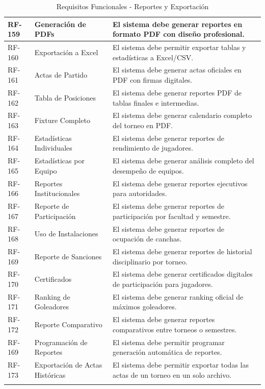 \documentclass[12pt,a4paper]{article}
\begin{document}
\begin{longtable}{|>{\centering\arraybackslash}p{1.5cm}|>{\raggedright\arraybackslash}p{3.2cm}|>{\raggedright\arraybackslash}p{9cm}|}
RF-159 & Generación de PDFs & El sistema debe generar reportes en formato PDF con diseño profesional. \\
\hline
\rowcolor{rowgray}
RF-160 & Exportación a Excel & El sistema debe permitir exportar tablas y estadísticas a Excel/CSV. \\
\hline
RF-161 & Actas de Partido & El sistema debe generar actas oficiales en PDF con firmas digitales. \\
\hline
\rowcolor{rowgray}
RF-162 & Tabla de Posiciones & El sistema debe generar reportes PDF de tablas finales e intermedias. \\
\hline
RF-163 & Fixture Completo & El sistema debe generar calendario completo del torneo en PDF. \\
\hline
\rowcolor{rowgray}
RF-164 & Estadísticas Individuales & El sistema debe generar reportes de rendimiento de jugadores. \\
\hline
RF-165 & Estadísticas por Equipo & El sistema debe generar análisis completo del desempeño de equipos. \\
\hline
\rowcolor{rowgray}
RF-166 & Reportes Institucionales & El sistema debe generar reportes ejecutivos para autoridades. \\
\hline
RF-167 & Reporte de Participación & El sistema debe generar reportes de participación por facultad y semestre. \\
\hline
\rowcolor{rowgray}
RF-168 & Uso de Instalaciones & El sistema debe generar reportes de ocupación de canchas. \\
\hline
RF-169 & Reporte de Sanciones & El sistema debe generar reportes de historial disciplinario por torneo. \\
\hline
\rowcolor{rowgray}
RF-170 & Certificados & El sistema debe generar certificados digitales de participación para jugadores. \\
\hline
RF-171 & Ranking de Goleadores & El sistema debe generar ranking oficial de máximos goleadores. \\
\hline
\rowcolor{rowgray}
RF-172 & Reporte Comparativo & El sistema debe generar reportes comparativos entre torneos o semestres. \\
\hline
RF-169 & Programación de Reportes & El sistema debe permitir programar generación automática de reportes. \\
\hline
\rowcolor{rowgray}
RF-173 & Exportación de Actas Históricas & El sistema debe permitir exportar todas las actas de un torneo en un solo archivo. \\
\hline
\caption{Requisitos Funcionales - Reportes y Exportación}
\end{longtable}
\end{document}
